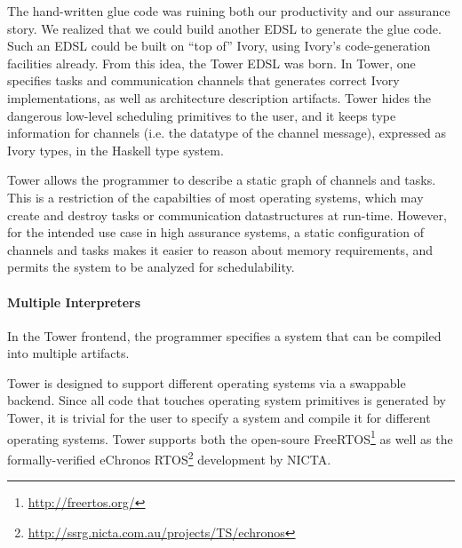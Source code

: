 The hand-written glue code was ruining both our productivity and our assurance
story.  We realized that we could build another EDSL to generate the glue code.
Such an EDSL could be built on ``top of'' Ivory, using Ivory's code-generation
facilities already.  From this idea, the Tower EDSL was born.  In Tower, one
specifies tasks and communication channels that generates correct Ivory
implementations, as well as architecture description artifacts. Tower hides the
dangerous low-level scheduling primitives to the user, and it keeps type
information for channels (i.e. the datatype of the channel message), expressed
as Ivory types, in the Haskell type system.

Tower allows the programmer to describe a static graph of channels and tasks.
This is a restriction of the capabilties of most operating systems, which may
create and destroy tasks or communication datastructures at run-time. However,
for the intended use case in high assurance systems, a static configuration of
channels and tasks makes it easier to reason about memory requirements, and
permits the system to be analyzed for schedulability.

\paragraph{Multiple Interpreters}


In the Tower frontend, the programmer specifies a system that can be compiled into
multiple artifacts.

Tower is designed to support different operating systems via a swappable
backend. Since all code that touches operating system primitives is generated by
Tower, it is trivial for the user to specify a system and compile it for
different operating systems. Tower supports both the open-soure
FreeRTOS\footnote{\url{http://freertos.org/}} as well as the formally-verified
eChronos RTOS\footnote{\url{http://ssrg.nicta.com.au/projects/TS/echronos}}
development by NICTA.


